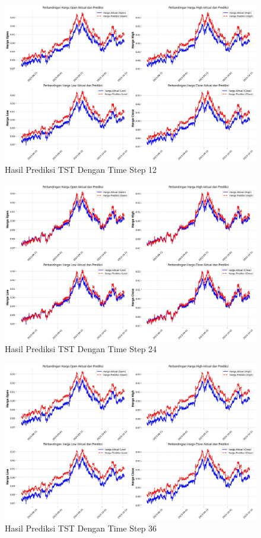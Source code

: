 \begin{figure} [H] \centering
    \includegraphics[scale=0.27]{gambar/perbandingan(12).png} 
    \caption{Hasil Prediksi TST Dengan Time Step 12}
    \label{fig:label_gambar}
\end{figure}
\begin{figure} [H] \centering
    \includegraphics[scale=0.27]{gambar/perbandingan(24).png} 
    \caption{Hasil Prediksi TST Dengan Time Step 24}
    \label{fig:label_gambar}
\end{figure}
\begin{figure} [H] \centering
    \includegraphics[scale=0.28]{gambar/perbandingan(36).png} 
    \caption{Hasil Prediksi TST Dengan Time Step 36}
    \label{fig:label_gambar}
\end{figure}


